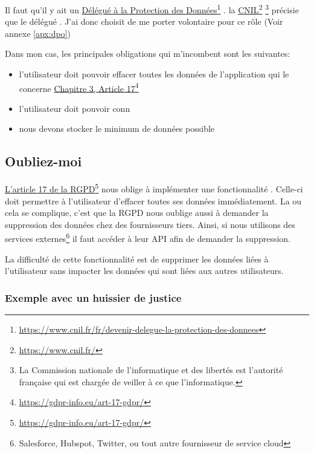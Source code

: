 \documentclass[]{report}
\newcommand\fnurl[2]{%
  \href{#1}{#2}\footnote{\url{#1}}%
}
\begin{document}
    Il faut qu'il y ait un \fnurl{https://www.cnil.fr/fr/devenir-delegue-la-protection-des-donnees}{Délégué à la Protection des Données}. la \fnurl{https://www.cnil.fr/}{CNIL}\footnote{La Commission nationale de l'informatique et des libertés est l'autorité française qui est chargée de veiller à ce que l’informatique.} précisie que le délégué . J'ai donc choisit de me porter volontaire pour ce rôle (Voir annexe \ref{apx:dpo})


    Dans mon cas, les principales obligations qui m'incombent sont les suivantes:

    \begin{itemize}
      \item l'utilisateur doit pouvoir effacer toutes les données de l'application qui le concerne \fnurl{https://gdpr-info.eu/art-17-gdpr/}{Chapitre 3, Article 17}
      \item l'utilisateur doit pouvoir conn
      \item nous devons stocker le minimum de données possible
    \end{itemize}


    \subsection{Oubliez-moi}

      \fnurl{https://gdpr-info.eu/art-17-gdpr/}{L'article 17 de la RGPD} nous oblige à implémenter une fonctionnalité . Celle-ci doit permettre à l'utilisateur d'effacer toutes ses données immédiatement. La ou cela se complique, c'est que la RGPD nous oublige aussi à demander la suppression des données chez des fournisseurs tiers. Ainsi, si nous utilisons des services externes\footnote{Salesforce, Hubspot, Twitter, ou tout autre fournisseur de service cloud} il faut accéder à leur API afin de demander la suppression.

      La difficulté de cette fonctionnalité est de supprimer les données liées à l'utilisateur sans impacter les données qui sont liées aux autres utilisateurs.

      \subsubsection{Exemple avec un huissier de justice}
\end{document}
